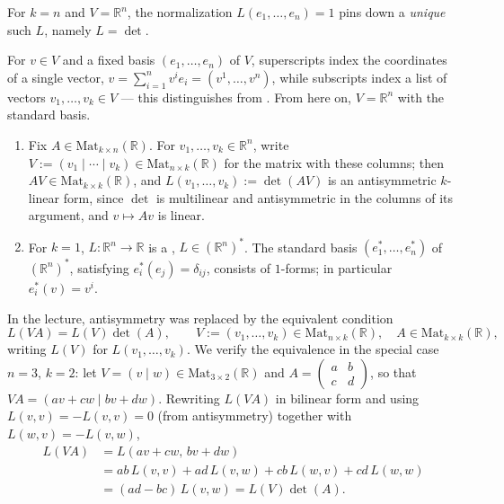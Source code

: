 \begin{remark}
For $k=n$ and $V = \mathbb{R}^n$, the normalization $L(e_1,\ldots,e_n) = 1$ pins down a
\emph{unique} such $L$, namely $L = \det$.
\end{remark}

\begin{notation}
For $v \in V$ and a fixed basis $(e_1,\ldots,e_n)$ of $V$, superscripts index the coordinates
of a single vector, $v = \sum_{i=1}^n v^i e_i = (v^1,\ldots,v^n)$, while subscripts index a
list of vectors $v_1,\ldots,v_k \in V$ --- this distinguishes  from . From here on, $V = \mathbb{R}^n$ with the
standard basis.
\end{notation}

\begin{aiexample}
\begin{enumerate}[label=\textbf{\arabic*.}]
  \item Fix $A \in \mathrm{Mat}_{k\times n}(\mathbb{R})$. For $v_1,\ldots,v_k \in
  \mathbb{R}^n$, write $V := (v_1\mid\cdots\mid v_k) \in \mathrm{Mat}_{n\times k}(\mathbb{R})$
  for the matrix with these columns; then $AV \in \mathrm{Mat}_{k\times k}(\mathbb{R})$, and
  $L(v_1,\ldots,v_k) := \det(AV)$ is an antisymmetric $k$-linear form, since $\det$ is
  multilinear and antisymmetric in the columns of its argument, and $v \mapsto Av$ is linear.
  \item For $k=1$, $L : \mathbb{R}^n \to \mathbb{R}$ is a ,
  $L \in (\mathbb{R}^n)^*$. The standard basis $(e_1^*,\ldots,e_n^*)$ of $(\mathbb{R}^n)^*$,
  satisfying $e_i^*(e_j) = \delta_{ij}$, consists of $1$-forms; in particular
  $e_i^*(v) = v^i$.
\end{enumerate}
\end{aiexample}

\begin{remark}
In the lecture, antisymmetry was replaced by the equivalent condition
\[L(VA) = L(V)\det(A), \qquad V := (v_1,\ldots,v_k) \in \mathrm{Mat}_{n\times k}(\mathbb{R}),
  \quad A \in \mathrm{Mat}_{k\times k}(\mathbb{R}),\]
writing $L(V)$ for $L(v_1,\ldots,v_k)$. We verify the equivalence in the special case $n=3$,
$k=2$: let $V = (v\mid w) \in \mathrm{Mat}_{3\times2}(\mathbb{R})$ and $A = \begin{pmatrix} a &
b \\ c & d \end{pmatrix}$, so that $VA = (av+cw \mid bv+dw)$. Rewriting $L(VA)$ in bilinear
form and using $L(v,v) = -L(v,v) = 0$ (from antisymmetry) together with $L(w,v) = -L(v,w)$,
\begin{align}
L(VA) &= L(av+cw,\,bv+dw) \nonumber \\
  &= ab\,L(v,v) + ad\,L(v,w) + cb\,L(w,v) + cd\,L(w,w) \nonumber \\
  &= (ad-bc)\,L(v,w) = L(V)\det(A). \nonumber
\end{align}
\end{remark}

